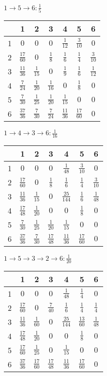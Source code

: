 \documentclass[russian]{article}
\begin{document}
$ 1 \to 5 \to 6 : \frac{1}{5}$

\begin{tabular}{|c|c|c|c|c|c|c|}\hline
& 1& 2& 3& 4& 5& 6\\\hline
1& $0$& $0$& $0$& $\frac{1}{12}$& $\frac{3}{10}$& $0$\\\hline
2& $\frac{17}{60}$& $0$& $\frac{1}{8}$& $\frac{1}{6}$& $\frac{1}{4}$& $\frac{3}{10}$\\\hline
3& $\frac{11}{36}$& $\frac{1}{15}$& $0$& $\frac{1}{9}$& $\frac{1}{6}$& $\frac{1}{12}$\\\hline
4& $\frac{7}{24}$& $\frac{1}{20}$& $\frac{1}{16}$& $0$& $\frac{1}{8}$& $0$\\\hline
5& $\frac{7}{30}$& $\frac{1}{25}$& $\frac{1}{20}$& $\frac{1}{15}$& $0$& $0$\\\hline
6& $\frac{37}{36}$& $\frac{7}{30}$& $\frac{7}{24}$& $\frac{11}{36}$& $\frac{17}{60}$& $0$\\\hline
\end{tabular}

$ 1 \to 4 \to 3 \to 6 : \frac{1}{16}$

\begin{tabular}{|c|c|c|c|c|c|c|}\hline
& 1& 2& 3& 4& 5& 6\\\hline
1& $0$& $0$& $0$& $\frac{1}{48}$& $\frac{3}{10}$& $0$\\\hline
2& $\frac{17}{60}$& $0$& $\frac{1}{8}$& $\frac{1}{6}$& $\frac{1}{4}$& $\frac{3}{10}$\\\hline
3& $\frac{11}{36}$& $\frac{1}{15}$& $0$& $\frac{25}{144}$& $\frac{1}{6}$& $\frac{1}{48}$\\\hline
4& $\frac{17}{48}$& $\frac{1}{20}$& $0$& $0$& $\frac{1}{8}$& $0$\\\hline
5& $\frac{7}{30}$& $\frac{1}{25}$& $\frac{1}{20}$& $\frac{1}{15}$& $0$& $0$\\\hline
6& $\frac{37}{36}$& $\frac{7}{30}$& $\frac{17}{48}$& $\frac{11}{36}$& $\frac{17}{60}$& $0$\\\hline
\end{tabular}

$ 1 \to 5 \to 3 \to 2 \to 6 : \frac{1}{20}$

\begin{tabular}{|c|c|c|c|c|c|c|}\hline
& 1& 2& 3& 4& 5& 6\\\hline
1& $0$& $0$& $0$& $\frac{1}{48}$& $\frac{1}{4}$& $0$\\\hline
2& $\frac{17}{60}$& $0$& $\frac{7}{40}$& $\frac{1}{6}$& $\frac{1}{4}$& $\frac{1}{4}$\\\hline
3& $\frac{11}{36}$& $\frac{1}{60}$& $0$& $\frac{25}{144}$& $\frac{13}{60}$& $\frac{1}{48}$\\\hline
4& $\frac{17}{48}$& $\frac{1}{20}$& $0$& $0$& $\frac{1}{8}$& $0$\\\hline
5& $\frac{17}{60}$& $\frac{1}{25}$& $0$& $\frac{1}{15}$& $0$& $0$\\\hline
6& $\frac{37}{36}$& $\frac{17}{60}$& $\frac{17}{48}$& $\frac{11}{36}$& $\frac{17}{60}$& $0$\\\hline
\end{tabular}
\end{document}
